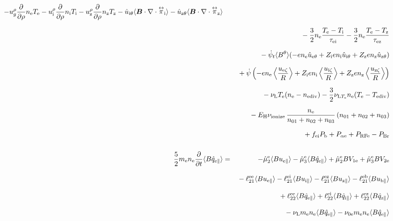 \documentclass[11pt]{article}
\def\bvec#1{\leavevmode\hbox{\boldmath$#1$}}
\let\vec=\bvec
\def\r#1{{\rm#1}}
\def\ave#1{\left\langle#1\right\rangle}
\def\aves#1{\langle#1\rangle}
\def\dd#1#2{\frac{\partial #1}{\partial #2}}
\def\tensor#1{\mathord{\displaystyle\mathop{#1}^\leftrightarrow}}
\def\para{\parallel}
\def\ddrho{\frac{\partial}{\partial\rho}}
\def\ddt{\frac{\partial}{\partial t}}
\def\psid{\dot{\psi}}
\def\psit{\psi_t}
\def\psitd{\dot{\psit}}
\def\me{m_\r{e}}
\def\mb{m_\r{b}}
\def\nee{n_\r{e}}
\def\ni{n_\r{i}}
\def\nz{n_\r{z}}
\def\Te{T_\r{e}}
\def\Ti{T_\r{i}}
\def\Tz{T_\r{z}}
\def\Zi{Z_\r{i}}
\def\Zz{Z_\r{z}}
\def\uzt#1{u_{\r{#1}\zeta}}
\def\upara#1{u_{\r{#1}\para}}
\def\uhatth#1{\hat{u}_{\r{#1}\theta}}
\def\qhatpara#1{\hat{q}_{\r{#1}\para}}
\def\urho#1{u_\r{#1}^\rho}
\def\ugrho{u_{g}^\rho}
\def\nun#1{\nu_\r{0#1}}
\def\ndiv#1{n_\r{#1div}}
\def\Tdiv#1{T_\r{#1div}}
\def\nuLT#1{\nu_{\r{L}T_\r{#1}}}
\def\PRF#1{P_\r{RF#1}}
\def\Palp#1{P_{\alpha\r{#1}}}
\def\fei{f_\r{ei}}
\def\PBr{P_\r{Br}}
\def\Pb{P_\r{b}}
\def\Eb{E_\r{b}}
\def\EH{E_\r{H}}
\def\nna{n_{01}}
\def\nnb{n_{02}}
\def\nnc{n_{03}}
\def\nuL{\nu_\r{L}}
\def\nuion{\nu_\r{ionize}}
\begin{document}
\begin{eqnarray}
%
  - \ugrho \ddrho \nee \Te
%
  - \urho{i} \ddrho \ni  \Ti
  - \urho{z} \ddrho \nz  \Tz
  - \uhatth{i} \aves{\vec{B}\cdot\nabla\cdot\tensor{\pi}_\r{i}}
  - \uhatth{z} \aves{\vec{B}\cdot\nabla\cdot\tensor{\pi}_\r{z}}
\nonumber\\[2.5mm]&&{}
%
  - \frac{3}{2} \nee \frac{ \Te - \Ti }{\tau_\r{ei}}
  - \frac{3}{2} \nee \frac{ \Te - \Tz }{\tau_\r{ez}}
\nonumber\\[2.5mm]&&{}
%
%
  - \dot{\psi}_t \aves{B^\theta} (-     e \nee \uhatth{e}
                                  + \Zi e \ni  \uhatth{i}
                                  + \Zz e \nz  \uhatth{z})
\nonumber\\[2.5mm]&&{}
%
%
  +\dot{\psi}\left(-     e \nee \ave{\frac{\uzt{e}}{R}}
	           + \Zi e \ni  \ave{\frac{\uzt{i}}{R}}
	           + \Zz e \nz  \ave{\frac{\uzt{z}}{R}}\right)
\nonumber\\[2.5mm]&&{}
%
  - \nuL \Te (\nee - \ndiv{e})
%
  - \frac{3}{2} \nuLT{e} \nee (\Te - \Tdiv{e})
%
\nonumber\\[2.5mm]&&{}
  - \EH \nuion\, \frac{\nee}{\nna + \nnb + \nnc}\, (\nna + \nnb + \nnc)
\nonumber\\[2.5mm]&&{}
%
  + \fei \Pb
%
%
  + \Palp{e}
%
  + \PRF{e}
%
  - \PBr
\\[5mm]
 \frac{5}{2} \me \nee \ddt \aves{B \qhatpara{e}} &=&
%
  - \hat{\mu}_2^\r{e} \aves{B \upara{e}} 
  - \hat{\mu}_3^\r{e} \aves{B \qhatpara{e}}
%
  + \hat{\mu}_2^\r{e} {B V_{1\r{e}}} 
  + \hat{\mu}_3^\r{e} {B V_{2\r{e}}}
\nonumber\\[3mm]&&{}
%
  - \ell_{21}^{\r{ee}} \aves{B \upara{e}}
  - \ell_{21}^{\r{ei}} \aves{B \upara{i}}
  - \ell_{21}^{\r{ez}} \aves{B \upara{z}}
  - \ell_{21}^{\r{eb}} \aves{B \upara{b}}
\nonumber\\[3mm]&&{}
%
  + \ell_{22}^{\r{ee}} \aves{B \qhatpara{e}}
  + \ell_{22}^{\r{ei}} \aves{B \qhatpara{i}}
  + \ell_{22}^{\r{ez}} \aves{B \qhatpara{z}}
\nonumber\\[3mm]&&{}
%
  - \nuL \me \nee \aves{B \qhatpara{e}}
%
  - \nun{e} \me \nee \aves{B \qhatpara{e}}
\end{eqnarray}
%
\end{document}
